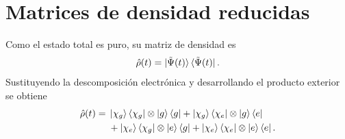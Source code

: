 \documentclass[11pt]{article}
\begin{document}
\section{Matrices de densidad reducidas}

Como el estado total es puro, su matriz de densidad es
\begin{equation}
  \hat\rho(t)
  =
  \ket{\tilde\Psi(t)}\bra{\tilde\Psi(t)}.
\end{equation}
Sustituyendo la descomposici\'on electr\'onica y desarrollando el producto
exterior se obtiene
\begin{equation}
\begin{aligned}
  \hat\rho(t)
  ={}&
  \ket{\chi_g}\bra{\chi_g}
  \otimes\ket g\bra g
  +
  \ket{\chi_g}\bra{\chi_e}
  \otimes\ket g\bra e
  \\
  &+
  \ket{\chi_e}\bra{\chi_g}
  \otimes\ket e\bra g
  +
  \ket{\chi_e}\bra{\chi_e}
  \otimes\ket e\bra e.
\end{aligned}
\end{equation}
\end{document}
